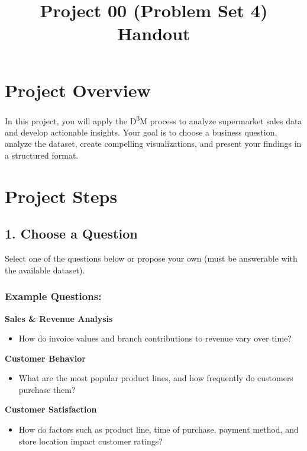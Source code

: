 \documentclass[
  11pt,
]{article}
\title{Project 00 (Problem Set 4) Handout}
\author{}
\date{\vspace{-2.5em}}
\providecommand{\tightlist}{%
  \setlength{\itemsep}{0pt}\setlength{\parskip}{0pt}}
\begin{document}
\maketitle

\section{Project Overview}\label{project-overview}

In this project, you will apply the D\textsuperscript{3}M process to
analyze supermarket sales data and develop actionable insights. Your
goal is to choose a business question, analyze the dataset, create
compelling visualizations, and present your findings in a structured
format.

\section{Project Steps}\label{project-steps}

\subsection{1. Choose a Question}\label{choose-a-question}

Select one of the questions below or propose your own (must be
answerable with the available dataset).

\subsubsection{Example Questions:}\label{example-questions}

\textbf{Sales \& Revenue Analysis}

\begin{itemize}
\tightlist
\item
  How do invoice values and branch contributions to revenue vary over
  time?
\end{itemize}

\textbf{Customer Behavior}

\begin{itemize}
\tightlist
\item
  What are the most popular product lines, and how frequently do
  customers purchase them?
\end{itemize}

\textbf{Customer Satisfaction}

\begin{itemize}
\tightlist
\item
  How do factors such as product line, time of purchase, payment method,
  and store location impact customer ratings?
\end{itemize}
\end{document}
